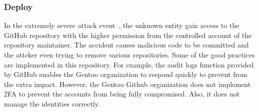 \subsubsection{Deploy}
In the extremely severe attack event~\cite{gentoo-incident-report}, 
the unknown entity gain access to the GitHub repository with the higher permission from the controlled
account of the repository maintainer. The accident causes malicious code to be committed and the
attcker even trying to remove various repositories. Some of the good practices are implemented
in this repository. For example, the audit logs function provided by GitHub enables the Gentoo organization
to respond quickly to prevent from the extra impact. However, the Gentoo Github organization does not
implement 2FA to prevent the accounts from being fully compromised. Also, it does not manage the identities
correctly.

